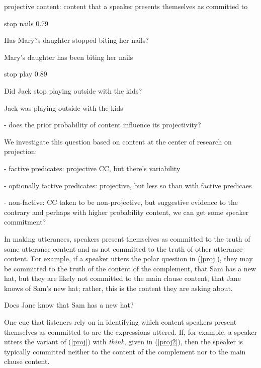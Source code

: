 \documentclass[11pt,fleqn]{article}
\newcommand{\6}{\mbox{$[\hspace*{-.6mm}[$}}
\newcommand{\9}{\mbox{$]\hspace*{-.6mm}]$}}
\begin{document}
projective content: content that a speaker presents themselves as committed to

stop nails 0.79

Has Mary?s daughter stopped biting her nails?

Mary's daughter has been biting her nails

stop play 0.89

Did Jack stop playing outside with the kids?

Jack was playing outside with the kids


\newpage

- does the prior probability of content influence its projectivity?

We investigate this question based on content at the center of research on projection:

- factive predicates: projective CC, but there's variability

- optionally factive predicates: projective, but less so than with factive predicaes

- non-factive: CC taken to be non-projective, but suggestive evidence to the contrary and perhaps with higher probability content, we can get some speaker commitment?

\newpage

In making utterances, speakers present themselves as committed to the truth of some utterance content and as not committed to the truth of other utterance content. For example, if a speaker utters the polar question in (\ref{proj}), they may be committed to the truth of the content of the complement, that Sam has a new hat, but they are likely not committed to the main clause content, that Jane knows of Sam's new hat; rather, this is the content they are asking about.

\begin{exe}
\ex\label{proj} Does Jane know that Sam has a new hat?
\end{exe}
One cue that listeners rely on in identifying which content speakers present themselves as committed to are the expressions uttered. If, for example, a speaker utters the variant of (\ref{proj}) with {\em think}, given in (\ref{proj2}), then the speaker is typically committed neither to the content of the complement nor to the main clause content. 
\end{document}
